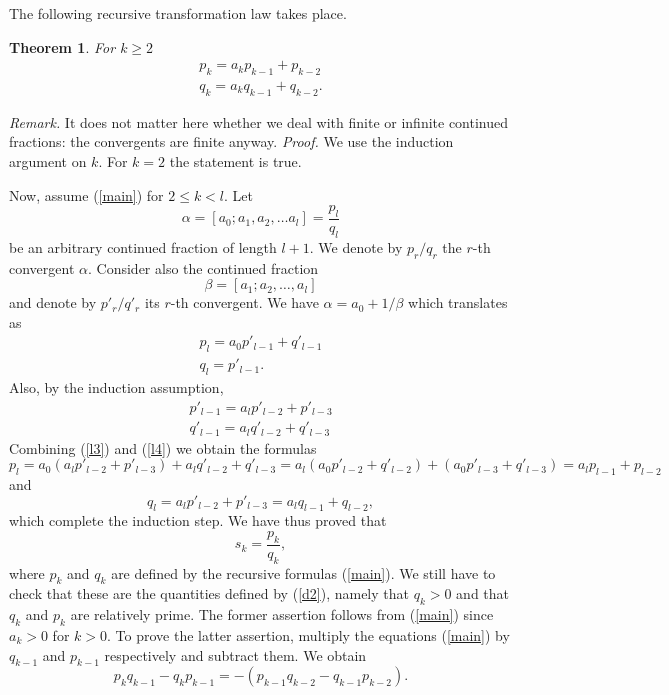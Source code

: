\documentclass[12pt,letterpaper]{book}
\newtheorem{theorem}{Theorem}
\begin{document}
The following recursive transformation law takes place.
\begin{theorem} \label{MAIN}
For $k \geq 2$
\begin{equation} \label{main}
\begin{array}{c}
\displaystyle
p_k=a_kp_{k-1} + p_{k-2} \\
\displaystyle q_k=a_kq_{k-1} + q_{k-2}.
\end{array}
\end{equation}

\end{theorem}
{\sl Remark.} It does not matter here whether we deal with finite or
infinite continued fractions: the convergents are finite anyway.
 {\sl Proof.} We use the induction argument on
$k$. For $k=2$ the statement is true.



Now, assume (\ref{main}) for $2 \leq k < l$. Let
$$
\alpha=[a_0;a_1,a_2,\ldots a_l]=\frac{p_l}{q_l}
$$
be an arbitrary continued fraction of length $l+1$. We denote by
$p_r/q_r$ the $r$-th convergent $\alpha$. Consider also the
continued fraction
$$
\beta = [a_1;a_2, \ldots, a_l]
$$
and denote by $p'_r/q'_r$ its $r$-th convergent. We have
$\alpha=a_0+1/\beta$ which translates as
\begin{equation} \label{l3}
\begin{array}{l}
p_l=a_0p'_{l-1} + q'_{l-1} \\
q_l=p'_{l-1}.
\end{array}
\end{equation}
Also, by the induction assumption,
\begin{equation} \label{l4}
\begin{array}{l}
p'_{l-1}=a_lp'_{l-2} + p'_{l-3} \\
q'_{l-1}=a_lq'_{l-2} + q'_{l-3}
\end{array}
\end{equation}
Combining (\ref{l3}) and (\ref{l4}) we obtain the formulas
$$
p_l=a_0(a_lp'_{l-2} + p'_{l-3}) + a_lq'_{l-2} + q'_{l-3} =
a_l(a_0p'_{l-2} + q'_{l-2}) + (a_0p'_{l-3} + q'_{l-3}) = a_lp_{l-1}
+ p_{l-2}
$$
and
$$
q_l=a_lp'_{l-2} +p'_{l-3}=a_lq_{l-1}+ q_{l-2},
$$
which complete the induction step. We have thus proved that
$$
s_k = \frac{p_k}{q_k},
$$
where $p_k$ and $q_k$ are defined by the recursive formulas
(\ref{main}). We still have to check that these are the quantities
defined by (\ref{d2}), namely that $q_k>0$ and that $q_k$ and $p_k$
are relatively prime. The former assertion follows from (\ref{main})
since $a_k>0$ for $k>0$. To prove the latter assertion, multiply the
equations (\ref{main}) by $q_{k-1}$ and $p_{k-1}$ respectively and
subtract them. We obtain
\begin{equation} \label{l5}
p_kq_{k-1} - q_kp_{k-1} = -(p_{k-1}q_{k-2} - q_{k-1} p_{k-2}).
\end{equation}
\end{document}
